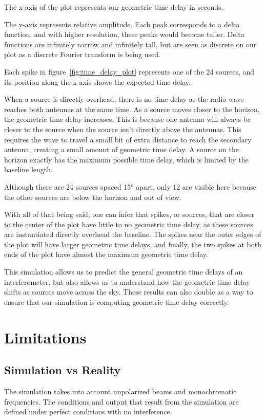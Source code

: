 \documentclass[12pt]{article}
\begin{document}
The x-axis of the plot represents our geometric time delay in seconds. 

The y-axis represents relative amplitude. Each peak corresponds to a delta function, and with higher resolution, these peaks would become taller. Delta functions are infinitely narrow and infinitely tall, but are seen as discrete on our plot as a discrete Fourier transform is being used.

Each spike in figure~\ref{fig:time_delay_plot} represents one of the 24 sources, and its position along the x-axis shows the expected time delay.

When a source is directly overhead, there is no time delay as the radio wave reaches both antennas at the same time. As a source moves closer to the horizon, the geometric time delay increases. This is because one antenna will always be closer to the source when the source isn't directly above the antennas. This requires the wave to travel a small bit of extra distance to reach the secondary antenna, creating a small amount of geometric time delay. A source on the horizon exactly has the maximum possible time delay, which is limited by the baseline length.

Although there are 24 sources spaced 15° apart, only 12 are visible here because the other sources are below the horizon and out of view. 

With all of that being said, one can infer that spikes, or sources, that are closer to the center of the plot have little to no geometric time delay, as these sources are instantiated directly overhead the baseline. The spikes near the outer edges of the plot will have larger geometric time delays, and finally, the two spikes at both ends of the plot have almost the maximum geometric time delay.

This simulation allows us to predict the general geometric time delays of an interferometer, but also allows us to understand how the geometric time delay shifts as sources move across the sky. These results can also double as a way to ensure that our simulation is computing geometric time delay correctly.

\section{Limitations}
\subsection{Simulation vs Reality}
The simulation takes into account unpolarized beams and monochromatic frequencies. The conditions and output that result from the simulation are defined under perfect conditions with no interference. 
\end{document}
